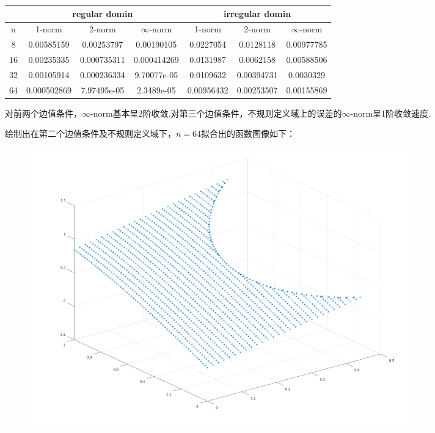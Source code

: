 \documentclass[a4paper,11.5pt,UTF8]{ctexart}
\begin{document}
\begin{large}
\begin{center}
\begin{tabular}{|c|c|c|c|c|c|c|}
	\hline
	& \multicolumn{3}{c|}{regular domin} & \multicolumn{3}{c|}{irregular domin} \\
	\hline
	n & 1-norm & 2-norm & $\infty$-norm & 1-norm &	2-norm& $\infty$-norm \\
	\hline
	8& 0.00585159 & 0.00253797 & 0.00190105 & 0.0227054 & 0.0128118 & 0.00977785 \\
	\hline
	16& 0.00235335 & 0.000735311 & 0.000414269 & 0.0131987 &0.0062158	&0.00588506\\
	\hline
	32& 0.00105914 & 0.000236334 & 9.70077e-05 & 0.0109632 &0.00394731&0.0030329\\
	\hline
	64& 0.000502869 & 7.97495e-05 & 2.3489e-05 & 0.00956432 &0.00253507&0.00155869 \\
	\hline
\end{tabular}
\end{center}
\par 对前两个边值条件，$\infty$-norm基本呈2阶收敛.对第三个边值条件，不规则定义域上的误差的$\infty$-norm呈1阶收敛速度.
\par 绘制出在第二个边值条件及不规则定义域下，$n=64$拟合出的函数图像如下：
\begin{figure}[H]
	\centering
	\includegraphics[width=0.8\textwidth,height=0.6\textwidth]{../output/image/image2.png}
\end{figure}


\end{large}
\end{document}
